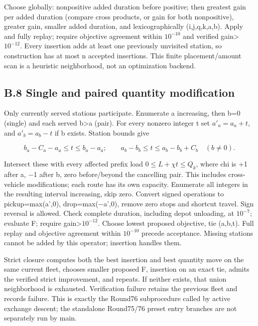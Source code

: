 \documentclass[
  american,
  11pt,
]{article}
\begin{document}
Choose globally: nonpositive added duration before positive; then
greatest gain per added duration (compare cross products, or gain for
both nonpositive), greater gain, smaller added duration, and
lexicographically (i,j,q,k,a,b). Apply and fully replay; require
objective agreement within \(10^{-10}\) and verified
gain\textgreater{}\(10^{-12}\). Every insertion adds at least one
previously unvisited station, so construction has at most n accepted
insertions. This finite placement/amount scan is a heuristic
neighborhood, not an optimization backend.

\subsection{B.8 Single and paired quantity
modification}\label{b.8-single-and-paired-quantity-modification}

Only currently served stations participate. Enumerate a increasing, then
b=0 (single) and each served b\textgreater a (pair). For every nonzero
integer t set \(a'_a=a_a+t\), and \(a'_b=a_b-t\) if b exists. Station
bounds give

\[
b_a-C_a-a_a\le t\le b_a-a_a;\qquad
a_b-b_b\le t\le a_b-b_b+C_b\quad(b\ne0).
\tag{B3}
\]

Intersect these with every affected prefix load
\(0\le L+\chi t\le Q_k\), where chi is +1 after a, −1 after b, zero
before/beyond the cancelling pair. This includes cross-vehicle
modifications; each route has its own capacity. Enumerate all integers
in the resulting interval increasing, skip zero. Convert signed
operations to pickup=max(a',0), drop=max(−a',0), remove zero stops and
shortcut travel. Sign reversal is allowed. Check complete duration,
including depot unloading, at \(10^{-7}\); evaluate F; require
gain\textgreater{}\(10^{-12}\). Choose lowest proposed objective, tie
(a,b,t). Full replay and objective agreement within \(10^{-10}\) precede
acceptance. Missing stations cannot be added by this operator; insertion
handles them.

Strict closure computes both the best insertion and best quantity move
on the same current fleet, chooses smaller proposed F, insertion on an
exact tie, admits the verified strict improvement, and repeats. If
neither exists, that union neighborhood is exhausted. Verification
failure retains the previous fleet and records failure. This is exactly
the Round76 subprocedure called by active exchange descent; the
standalone Round75/76 preset entry branches are not separately run by
main.
\end{document}
